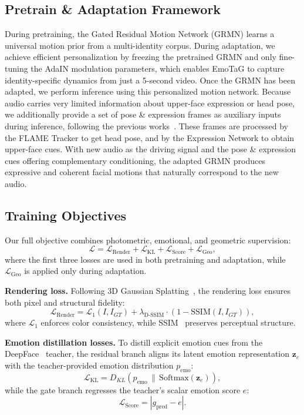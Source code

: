 \subsection{Pretrain \& Adaptation Framework}
During pretraining, the Gated Residual Motion Network (GRMN) learns a universal motion prior from a multi-identity corpus. During adaptation, we achieve efficient personalization by freezing the pretrained GRMN and only fine-tuning the AdaIN modulation parameters, which enables EmoTaG to capture identity-specific dynamics from just a 5-second video. Once the GRMN has been adapted, we perform inference using this personalized motion network. Because audio carries very limited information about upper-face expression or head pose, we additionally provide a set of pose \& expression frames as auxiliary inputs during inference, following the previous works~\cite{ye2024real3d,ye2024mimictalk,li2025instag}. These frames are processed by the FLAME Tracker to get head pose, and by the Expression Network to obtain upper-face cues. With new audio as the driving signal and the pose \& expression cues offering complementary conditioning, the adapted GRMN produces expressive and coherent facial motions that naturally correspond to the new audio.

\subsection{Training Objectives}

\label{sec:training}
Our full objective combines photometric, emotional, and geometric supervision:
\begin{equation}
\mathcal{L} = 
\mathcal{L}_{\text{Render}} +
\mathcal{L}_{\text{KL}} +
\mathcal{L}_{\text{Score}} +
\mathcal{L}_{\text{Geo}},
\end{equation}
where the first three losses are used in both pretraining and adaptation, while $\mathcal{L}_{\text{Geo}}$ is applied only during adaptation.

\noindent \textbf{Rendering loss.} 
Following 3D Gaussian Splatting~\cite{kerbl20233d}, the rendering loss ensures both pixel and structural fidelity:
\begin{equation}
\mathcal{L}_{\text{Render}} =
\mathcal{L}_{1}(I, I_{GT}) +
\lambda_{\text{D-SSIM}}\!\cdot\!(1 - \mathrm{SSIM}(I, I_{GT})),
\end{equation}
where $\mathcal{L}_{1}$ enforces color consistency, while SSIM~\cite{wang2004image} preserves perceptual structure.

\noindent \textbf{Emotion distillation losses.}  
To distill explicit emotion cues from the DeepFace~\cite{serengil2024lightface} teacher, the residual branch aligns its latent emotion representation $\mathbf{z}_e$ with the teacher-provided emotion distribution $p_{\text{emo}}$:
\begin{equation}
\mathcal{L}_{\text{KL}} = D_{KL}\!\left(p_{\text{emo}} \,\|\, \mathrm{Softmax}(\mathbf{z}_e)\right),
\end{equation}
while the gate branch regresses the teacher’s scalar emotion score $e$:
\begin{equation}
\mathcal{L}_{\text{Score}} = |g_{\text{pred}} - e|.
\end{equation}

